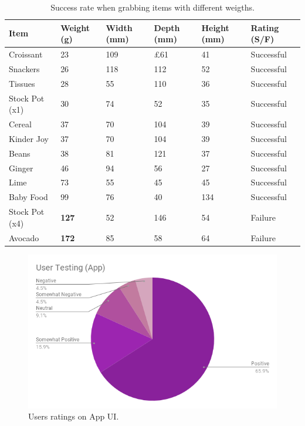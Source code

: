 \documentclass[a4paper]{article}
\begin{document}
\begin{center}
\begin{table}[H]
\centering
\begin{tabular}{| p{2.5cm} | p{2cm} | p{2cm} | p{2cm} | p{2cm} | p{2cm} |}
\hline
\textbf{Item} & \textbf{Weight (g)} & \textbf{Width (mm)} & \textbf{Depth (mm)} & \textbf{Height (mm)} & \textbf{Rating (S/F)} \\
\hline
Croissant & 23 & 109 & £61 & 41 & Successful \\
\hline
Snackers & 26 & 118 & 112 & 52 & Successful \\
\hline
Tissues & 28 & 55 & 110 & 36 & Successful \\
\hline
Stock Pot (x1) & 30 & 74 & 52 & 35 & Successful \\
\hline
Cereal & 37 & 70 & 104 & 39 & Successful \\
\hline
Kinder Joy & 37 & 70 & 104 & 39 & Successful \\
\hline
Beans & 38 & 81 & 121 & 37 & Successful \\ 
\hline
Ginger & 46 & 94 & 56 & 27 & Successful \\ 
\hline
Lime & 73 & 55 & 45 & 45 & Successful \\
\hline
Baby Food & 99 & 76 & 40 & 134 & Successful \\ 
\hline
Stock Pot (x4) & \textbf{127} & 52 & 146 & 54 & Failure \\
 \hline
Avocado & \textbf{172} & 85 & 58 & 64 & Failure \\ 
\hline
\end{tabular}
\caption{Success rate when grabbing items with different weigths.}
\end{table}

\begin{figure}[H]
  \includegraphics[width=\linewidth]{ease-app.png}
  \caption{Users ratings on App UI.}\label{fig:awesome_image1}
\endminipage
\newline
\end{figure}


\end{center}
\end{document}
